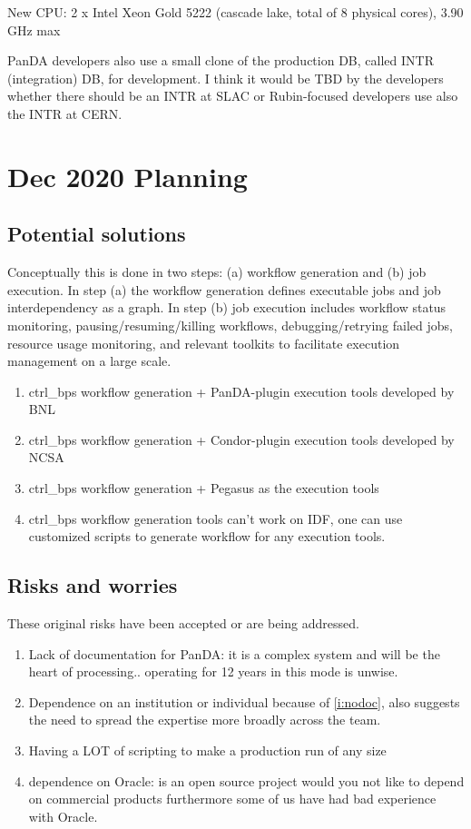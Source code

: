New CPU: 2 x Intel Xeon Gold 5222 (cascade lake, total of 8 physical cores), 3.90 GHz max

PanDA developers also use a small clone of the production DB, called INTR (integration) DB, for development. I think it would be TBD by the developers whether there should be an INTR at SLAC or Rubin-focused developers use also the INTR at CERN.


\section {Dec 2020 Planning}
\subsection {Potential solutions} \label{sec:potential}

Conceptually this is done in two steps: (a) workflow generation and (b) job execution.
In step (a) the workflow generation defines executable jobs and job interdependency as a graph.
In step (b) job execution includes workflow status monitoring, pausing/resuming/killing workflows, debugging/retrying failed jobs, resource usage monitoring, and relevant toolkits to facilitate execution management on a large scale.
\begin{enumerate}
\item  ctrl\_bps workflow generation + PanDA-plugin execution tools developed by BNL
\item ctrl\_bps workflow generation + Condor-plugin execution tools developed by NCSA
\item ctrl\_bps workflow generation + Pegasus as the execution tools
\item ctrl\_bps workflow generation tools can't work on IDF, one can use customized scripts to generate workflow for any execution tools.
\end{enumerate}



\subsection {Risks and worries}
These original risks have been accepted or are being addressed.
\begin{enumerate}
\item Lack of documentation for PanDA: it is a complex system and will
  be the heart of processing.. operating for 12 years in this mode is unwise.\label{i:nodoc}
\item Dependence on an institution or individual because of
  \ref{i:nodoc}, also suggests the need to spread the expertise more
  broadly across the team.
\item Having a LOT of scripting to make a production run of any size
\item dependence on Oracle: is an open source project would you not like to depend on commercial products furthermore some of us have had bad experience with Oracle.
\end{enumerate}
